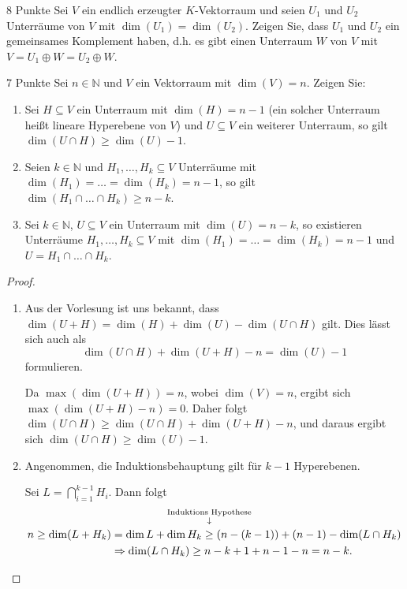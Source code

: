 \documentclass{problemset}
\begin{document}
\begin{problem}{8 Punkte}
Sei $V$ ein endlich erzeugter $K$-Vektorraum und seien $U_1$ und $U_2$ Unterräume von $V$ mit $\dim(U_1) = \dim(U_2)$. Zeigen Sie, dass $U_1$ und $U_2$ ein gemeinsames Komplement haben, d.h. es gibt einen Unterraum $W$ von $V$ mit $V = U_1 \oplus W = U_2 \oplus W$.
\end{problem}

\begin{problem}{7 Punkte}
Sei $n \in \mathbb{N}$ und $V$ ein Vektorraum mit $\dim(V) = n$. Zeigen Sie:
\begin{enumerate}
    \item Sei $H \subseteq V$ ein Unterraum mit $\dim(H) = n - 1$ (ein solcher Unterraum
          heißt lineare Hyperebene von $V$) und $U \subseteq V$ ein weiterer Unterraum,
          so gilt $\dim(U \cap H) \geq \dim(U) - 1$.
    \item Seien $k \in \mathbb{N}$ und $H_1, \ldots, H_k \subseteq V$ Unterräume mit
          $\dim(H_1) = \ldots = \dim(H_k) = n - 1$, so gilt $\dim(H_1 \cap \ldots \cap
              H_k) \geq n - k$.
    \item Sei $k \in \mathbb{N}$, $U \subseteq V$ ein Unterraum mit $\dim(U) = n - k$, so
          existieren Unterräume $H_1, \ldots, H_k \subseteq V$ mit $\dim(H_1) = \ldots =
              \dim(H_k) = n - 1$ und $U = H_1 \cap \ldots \cap H_k$.
\end{enumerate}

\begin{proof}
    $ $
    \begin{enumerate}
        \item Aus der Vorlesung ist uns bekannt, dass $\dim(U+H) = \dim(H) + \dim(U) - \dim(U
                  \cap H)$ gilt. Dies lässt sich auch als \[
                  \dim(U \cap H) + \dim(U + H) - n = \dim(U) - 1
              \] formulieren.

              Da $\max(\dim(U + H)) = n$, wobei $\dim(V) = n$, ergibt sich $\max(\dim(U + H)
                  - n) = 0$. Daher folgt $\dim(U \cap H) \ge \dim(U \cap H) + \dim(U + H) - n$,
              und daraus ergibt sich $\dim(U \cap H) \geq \dim(U) - 1$.

        \item Angenommen, die Induktionsbehauptung gilt für $k-1$ Hyperebenen.

              Sei $L = \bigcap_{i=1}^{k-1} H_i$. Dann folgt
              \begin{align*}
                  n \ge \dim(L + H_k) & = \dim L + \dim H_k \annotated{Induktions Hypothese}{\ge} (n - (k-1)) + (n-1) - \dim(L \cap H_k) \\
                                      & \Rightarrow \dim(L \cap H_k) \ge n - k + 1 + n - 1 - n = n - k.
              \end{align*}

    \end{enumerate}
\end{proof}
\end{problem}
\end{document}
